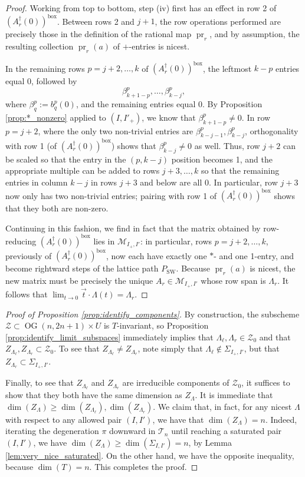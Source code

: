 \documentclass[12pt]{amsart}
\DeclareMathOperator{\inbox}{box}
\DeclareMathOperator{\pr}{pr}
\DeclareMathOperator{\OG}{OG}
\DeclareMathOperator{\SW}{SW}
\newcommand{\cM}{\mathcal{M}}
\newcommand{\cT}{\mathcal{T}}
\newcommand{\cZ}{\mathcal{Z}}
\newcommand{\vectt}{\overrightarrow{t}}
\begin{document}
\begin{proof}
Working from top to bottom, step (iv) first has an effect in row 2 of $(A^\dagger_r(0))^{\inbox}$. Between rows 2 and $j+1$, the row operations performed are precisely those in the definition of the rational map $\pr_r$, and by assumption, the resulting collection $\pr_r(a)$ of $+$-entries is nicest.

In the remaining rows $p=j+2,\ldots,k$ of $(A^\dagger_r(0))^{\inbox}$, the leftmost $k-p$ entries equal 0, followed by 
\begin{equation*}
    \beta^p_{k+1-p},\ldots,\beta^p_{k-j},
\end{equation*}
where $\beta^p_q:=b^p_q(0)$, and the remaining entries equal 0. By Proposition \ref{prop:*_nonzero} applied to $(I,I'_+)$, we know that $\beta^p_{k+1-p}\neq0$. In row $p=j+2$, where the only two non-trivial entries are $\beta^p_{k-j-1},\beta^p_{k-j}$, orthogonality with row 1 (of $(A^\dagger_r(0))^{\inbox}$) shows that $\beta^p_{k-j}\neq0$ as well. Thus, row $j+2$ can be scaled so that the entry in the $(p,k-j)$ position becomes 1, and the appropriate multiple can be added to rows $j+3,\ldots,k$ so that the remaining entries in column $k-j$ in rows $j+3$ and below are all 0. In particular, row $j+3$ now only has two non-trivial entries; pairing with row 1 of $(A^\dagger_r(0))^{\inbox}$ shows that they both are non-zero.

Continuing in this fashion, we find in fact that the matrix obtained by row-reducing  $(A^\dagger_r(0))^{\inbox}$ lies in $\cM_{I_+,I'}$: in particular, rows $p=j+2,\ldots,k$, previously of $(A^\dagger_r(0))^{\inbox}$, now each have exactly one $*$- and one 1-entry, and become rightward steps of the lattice path $P_{\SW}$. Because $\pr_r(a)$ is nicest, the new matrix must be precisely the unique $A_r\in\cM_{I_+,I'}$ whose row span is $\Lambda_r$. It follows that $\lim_{t\to 0}\vectt\cdot \Lambda(t)=\Lambda_r$.

\end{proof}

\begin{proof}[Proof of Proposition \ref{prop:identify_components}]
    By construction, the subscheme $\cZ\subset \OG(n,2n+1)\times U$ is $T$-invariant, so Proposition \ref{prop:identify_limit_subspaces} immediately implies that  $\Lambda_\ell,\Lambda_r\in \cZ_0$ and that $Z_{\Lambda_\ell},Z_{\Lambda_r}\subset\cZ_0$. To see that $Z_{\Lambda_\ell}\neq Z_{\Lambda_r}$, note simply that $\Lambda_\ell\notin\Sigma_{I_+,I'}$, but that $Z_{\Lambda_r}\subset \Sigma_{I_+,I'}$. 
    
    Finally, to see that $Z_{\Lambda_\ell}$ and $Z_{\Lambda_r}$ are irreducible components of $\cZ_0$, it suffices to show that they both have the same dimension as $Z_\Lambda$. It is immediate that $\dim(Z_\Lambda)\ge \dim(Z_{\Lambda_\ell}),\dim(Z_{\Lambda_r})$. We claim that, in fact, for any nicest $\Lambda$ with respect to any allowed pair $(I,I')$, we have that $\dim(Z_\Lambda)=n$. Indeed, iterating the degeneration $\pi$ downward in $\cT_n$ until reaching a saturated pair $(I,I')$, we have $\dim(Z_\Lambda)\ge \dim(\Sigma_{I,I'})=n$, by Lemma \ref{lem:very_nice_saturated}. On the other hand, we have the opposite inequality, because $\dim(T)=n$. This completes the proof.
\end{proof}
\end{document}
